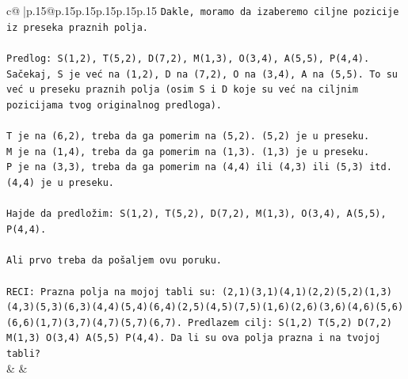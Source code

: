 \documentclass{article}
\begin{document}
{\begin{supertabular}{c@{$\;$}|p{.15\linewidth}@{}p{.15\linewidth}p{.15\linewidth}p{.15\linewidth}p{.15\linewidth}p{.15\linewidth}}
{{{\texttt{Dakle, moramo da izaberemo ciljne pozicije iz preseka praznih polja.} \\
\\ 
\texttt{Predlog: S(1,2), T(5,2), D(7,2), M(1,3), O(3,4), A(5,5), P(4,4). Sačekaj, S je već na (1,2), D na (7,2), O na (3,4), A na (5,5). To su već u preseku praznih polja (osim S i D koje su već na ciljnim pozicijama tvog originalnog predloga). } \\
\\ 
\texttt{T je na (6,2), treba da ga pomerim na (5,2). (5,2) je u preseku.} \\
\texttt{M je na (1,4), treba da ga pomerim na (1,3). (1,3) je u preseku.} \\
\texttt{P je na (3,3), treba da ga pomerim na (4,4) ili (4,3) ili (5,3) itd. (4,4) je u preseku.} \\
\\ 
\texttt{Hajde da predložim: S(1,2), T(5,2), D(7,2), M(1,3), O(3,4), A(5,5), P(4,4).} \\
\\ 
\texttt{Ali prvo treba da pošaljem ovu poruku.} \\
\\ 
\texttt{RECI: Prazna polja na mojoj tabli su: (2,1)(3,1)(4,1)(2,2)(5,2)(1,3)(4,3)(5,3)(6,3)(4,4)(5,4)(6,4)(2,5)(4,5)(7,5)(1,6)(2,6)(3,6)(4,6)(5,6)(6,6)(1,7)(3,7)(4,7)(5,7)(6,7). Predlazem cilj: S(1,2) T(5,2) D(7,2) M(1,3) O(3,4) A(5,5) P(4,4). Da li su ova polja prazna i na tvojoj tabli?} \\
            }
        }
    }
    & & \\ \\


\end{supertabular}}
\end{document}
